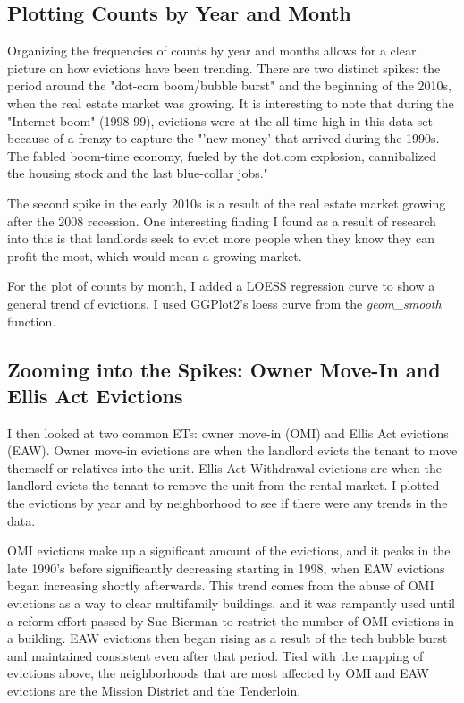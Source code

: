 \documentclass{article}\usepackage[]{graphicx}\usepackage[]{xcolor}
\begin{document}
\subsection{Plotting Counts by Year and Month}
Organizing the frequencies of counts by year and months allows for a clear picture on how evictions have been trending. There are two distinct spikes: the period around the "dot-com boom/bubble burst" and the beginning of the 2010s, when the real estate market was growing. It is interesting to note that during the "Internet boom" (1998-99), evictions were at the all time high in this data set because of a frenzy to capture the "'new money' that arrived during the 1990s. The fabled boom-time economy, fueled by the dot.com explosion, cannibalized the housing stock and the last blue-collar jobs."

The second spike in the early 2010s is a result of the real estate market growing after the 2008 recession. One interesting finding I found as a result of research into this is that landlords seek to evict more people when they know they can profit the most, which would mean a growing market.

For the plot of counts by month, I added a LOESS regression curve to show a general trend of evictions. I used GGPlot2's loess curve from the \emph{geom\_smooth} function.

\subsection{Zooming into the Spikes: Owner Move-In and Ellis Act Evictions}
I then looked at two common ETs: owner move-in (OMI) and Ellis Act evictions (EAW). Owner move-in evictions are when the landlord evicts the tenant to move themself or relatives into the unit. Ellis Act Withdrawal evictions are when the landlord evicts the tenant to remove the unit from the rental market. I plotted the evictions by year and by neighborhood to see if there were any trends in the data.

OMI evictions make up a significant amount of the evictions, and it peaks in the late 1990's before significantly decreasing starting in 1998, when EAW evictions began increasing shortly afterwards. This trend comes from the abuse of OMI evictions as a way to clear multifamily buildings, and it was rampantly used until a reform effort passed by Sue Bierman to restrict the number of OMI evictions in a building. EAW evictions then began rising as a result of the tech bubble burst and maintained consistent even after that period. Tied with the mapping of evictions above, the neighborhoods that are most affected by OMI and EAW evictions are the Mission District and the Tenderloin.
\end{document}
